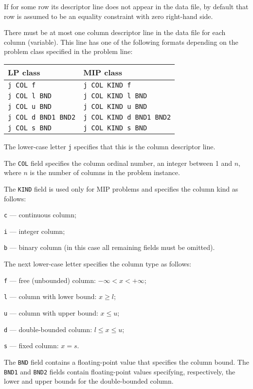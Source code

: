 If for some row its descriptor line does not appear in the data file,
by default that row is assumed to be an equality constraint with zero
right-hand side.

 There must be at most one column descriptor
line in the data file for each column (variable). This line has one of
the following formats depending on the problem class specified in the
problem line:

\begin{tabular}{@{}l@{\hspace*{40pt}}l}
LP class & MIP class \\
\hline
\verb|j COL f|           & \verb|j COL KIND f|           \\
\verb|j COL l BND|       & \verb|j COL KIND l BND|       \\
\verb|j COL u BND|       & \verb|j COL KIND u BND|       \\
\verb|j COL d BND1 BND2| & \verb|j COL KIND d BND1 BND2| \\
\verb|j COL s BND|       & \verb|j COL KIND s BND|       \\
\end{tabular}

The lower-case letter \verb|j| specifies that this is the column
descriptor line.

The \verb|COL| field specifies the column ordinal number, an integer
between 1 and $n$, where $n$ is the number of columns in the problem
instance.

The \verb|KIND| field is used only for MIP problems and specifies the
column kind as follows:

\verb|c| --- continuous column;

\verb|i| --- integer column;

\verb|b| --- binary column (in this case all remaining fields must be
omitted).

The next lower-case letter specifies the column type as follows:

\verb|f| --- free (unbounded) column: $-\infty<x<+\infty$;

\verb|l| --- column with lower bound: $x\geq l$;

\verb|u| --- column with upper bound: $x\leq u$;

\verb|d| --- double-bounded column: $l\leq x\leq u$;

\verb|s| --- fixed column: $x=s$.

The \verb|BND| field contains a floating-point value that specifies the
column bound. The \verb|BND1| and \verb|BND2| fields contain
floating-point values specifying, respectively, the lower and upper
bounds for the double-bounded column.

